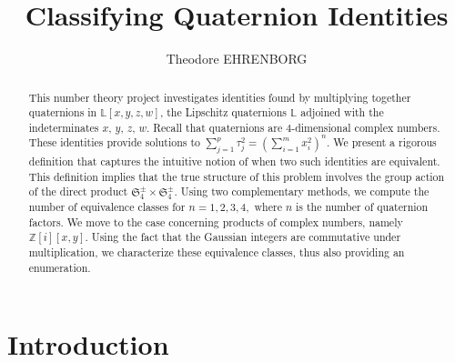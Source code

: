 \documentclass[12pt]{article}
\theoremstyle{definition}
\theoremstyle{remark}
\newcommand{\Zzz}{\mathbb Z}
\newcommand{\Lll}{\mathbb L}
\numberwithin{equation}{section}
\begin{document}


\title{Classifying Quaternion Identities}


\author{\sc Theodore EHRENBORG%
}



\date{}

\maketitle



\begin{abstract}
This number theory project investigates identities found by
multiplying together quaternions in \( \Lll[x,y,z,w] \), the
Lipschitz quaternions \( \Lll \) adjoined with the
indeterminates \(x\), \(y\), \(z\), \(w\).  Recall that quaternions
are \(4\)-dimensional complex numbers.  These identities provide
solutions to \( \sum_{j = 1}^{p} \tau_j ^ 2 = \left( \sum_{i = 1}^{m}
x_i ^ 2 \right) ^ n \). We present a rigorous definition that captures
the intuitive notion of when two such identities are equivalent. This
definition implies that the true structure of this problem involves the
group action of the direct product \( \mathfrak{S}_4^\pm \times \mathfrak{S}_4^\pm \).  Using
two complementary methods, we compute the number of equivalence
classes for \(n = 1, 2, 3, 4,\) where \(n\) is the number of
quaternion factors. We move to the case concerning products of complex
numbers, namely \( \Zzz[i][x,y] \). Using the fact that the
Gaussian integers are commutative under multiplication, we
characterize these equivalence classes, thus also providing an
enumeration.


\end{abstract}





\section{Introduction}



\end{document}
